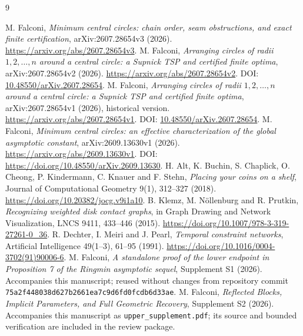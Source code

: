 \documentclass[11pt,letterpaper]{article}
\theoremstyle{definition}\newtheorem{definition}[theorem]{Definition}
\theoremstyle{remark}\newtheorem{remark}[theorem]{Remark}
\begin{document}
\begin{thebibliography}{9}
\small\raggedright
{} M. Falconi, \emph{Minimum central circles: chain order,
seam obstructions, and exact finite certification}, arXiv:2607.28654v3 (2026).
\url{https://arxiv.org/abs/2607.28654v3}.
 M. Falconi, \emph{Arranging circles of radii $1,2,\ldots,n$
around a central circle: a Supnick TSP and certified finite optima},
arXiv:2607.28654v2 (2026).
\url{https://arxiv.org/abs/2607.28654v2}.
DOI: \href{https://doi.org/10.48550/arXiv.2607.28654}{10.48550/arXiv.2607.28654}.
 M. Falconi, \emph{Arranging circles of radii $1,2,\ldots,n$
around a central circle: a Supnick TSP and certified finite optima},
arXiv:2607.28654v1 (2026), historical version.
\url{https://arxiv.org/abs/2607.28654v1}.
DOI: \href{https://doi.org/10.48550/arXiv.2607.28654}{10.48550/arXiv.2607.28654}.
 M. Falconi, \emph{Minimum central circles:
an effective characterization of the global asymptotic constant},
arXiv:2609.13630v1 (2026).
\url{https://arxiv.org/abs/2609.13630v1}.
DOI: \url{https://doi.org/10.48550/arXiv.2609.13630}.
 H. Alt, K. Buchin, S. Chaplick, O. Cheong, P. Kindermann,
C. Knauer and F. Stehn, \emph{Placing your coins on a shelf},
Journal of Computational Geometry 9(1), 312--327 (2018).
\url{https://doi.org/10.20382/jocg.v9i1a10}.
 B. Klemz, M. N\"ollenburg and R. Prutkin,
\emph{Recognizing weighted disk contact graphs}, in Graph Drawing and
Network Visualization, LNCS 9411, 433--446 (2015).
\url{https://doi.org/10.1007/978-3-319-27261-0_36}.
 R. Dechter, I. Meiri and J. Pearl,
\emph{Temporal constraint networks}, Artificial Intelligence
49(1--3), 61--95 (1991).
\url{https://doi.org/10.1016/0004-3702(91)90006-6}.
 M. Falconi, \emph{A standalone proof of the lower endpoint
in Proposition 7 of the Ringmin asymptotic sequel}, Supplement S1 (2026).
Accompanies this manuscript; reused without changes from repository
commit \texttt{75a2f448038d627b2661ea7c9d6fd0fcdb6d33ae}.
 M. Falconi, \emph{Reflected Blocks, Implicit Parameters,
and Full Geometric Recovery}, Supplement S2 (2026).
Accompanies this manuscript as \texttt{upper\_supplement.pdf};
its source and bounded verification are included in the review package.
\end{thebibliography}
\end{document}
